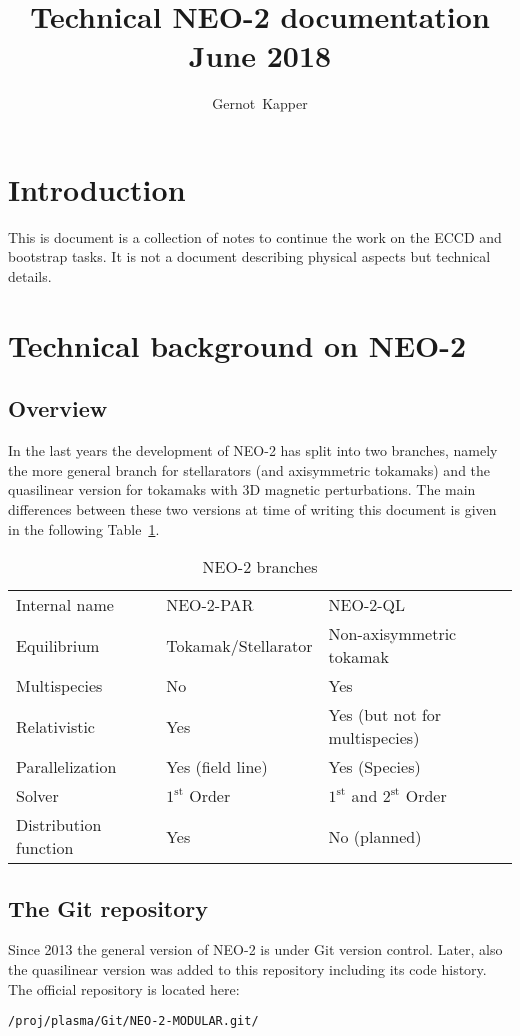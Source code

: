 \documentclass{article}
\title{\textbf{Technical NEO-2 documentation\\June 2018}}
\author[1]{Gernot~Kapper}
\affil[1]{Fusion@\"OAW, Institute of Theoretical and Computational Physics, Graz University of Technology, Petersgasse 16, 8010 Graz, Austria}
\date{}
\begin{document}
\onehalfspacing

\maketitle

\section{Introduction}
This is document is a collection of notes to continue the work on the ECCD and bootstrap tasks. It is not a document describing physical aspects but technical details. 

\section{Technical background on NEO-2}
\subsection{Overview}
In the last years the development of NEO-2 has split into two branches, namely the more general branch for stellarators (and axisymmetric tokamaks) and the quasilinear version for tokamaks with 3D magnetic perturbations. The main differences between these two versions at time of writing this document is given in the following Table~\ref{tab:neo2branches}. 

\begin{table}[h]
\centering
\begin{tabular}{lll}
Internal name   & NEO-2-PAR & NEO-2-QL\\
Equilibrium     & Tokamak/Stellarator & Non-axisymmetric tokamak\\
Multispecies    & No & Yes\\
Relativistic    & Yes & Yes (but not for multispecies)\\
Parallelization & Yes (field line) & Yes (Species)\\
Solver          & $1^\mathrm{st}$ Order & $1^\mathrm{st}$ and $2^\mathrm{st}$ Order\\
Distribution function & Yes & No (planned)\
\end{tabular}
\caption{NEO-2 branches}
\label{tab:neo2branches}
\end{table}

\subsection{The Git repository}
Since 2013 the general version of NEO-2 is under Git version control. Later, also the quasilinear version was added to this repository including its code history. The official repository is located here:
\begin{verbatim}
/proj/plasma/Git/NEO-2-MODULAR.git/
\end{verbatim}
\end{document}
